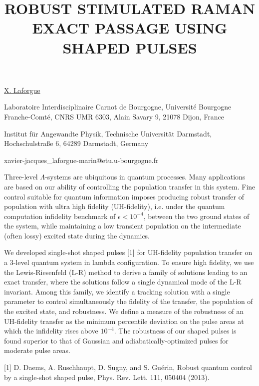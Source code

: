 \title{ROBUST STIMULATED RAMAN EXACT PASSAGE USING SHAPED PULSES}

\underline{X. Laforgue}  

{\normalsize{\vspace{-4mm}
Laboratoire Interdisciplinaire Carnot de Bourgogne, Universit\'e Bourgogne Franche-Comt\'e, CNRS UMR 6303, Alain Savary 9, 21078 Dijon, France

Institut f\"ur Angewandte Physik, Technische Universit\"at Darmstadt, Hochschulstra\ss e 6, 64289 Darmstadt, Germany



\email xavier-jacques\_laforgue-marin@etu.u-bourgogne.fr}}

Three-level $\Lambda$-systems are ubiquitous in quantum processes. Many applications are based on our ability of controlling the population transfer in this system. Fine control suitable for quantum information imposes producing robust transfer of population with ultra high fidelity (UH-fidelity), i.e. under the quantum computation infidelity benchmark of $\epsilon<10^{-4}$, between the two ground states of the system, while maintaining a low transient population on the intermediate (often lossy) excited state during the dynamics.

We developed single-shot shaped pulses [1] for UH-fidelity population transfer on a 3-level quantum system in lambda configuration. To ensure high fidelity, we use the Lewis-Riesenfeld (L-R) method to derive a family of solutions leading to an exact transfer, where the solutions follow a single dynamical mode of the L-R invariant. Among this family, we identify a tracking solution with a single parameter to control simultaneously the fidelity of the transfer, the population of the excited state, and robustness. We define a measure of the robustness of an UH-fidelity transfer as the minimum percentile deviation on the pulse areas at which the infidelity rises above $10^{-4}$. The robustness of our shaped pulses is found superior to that of Gaussian and adiabatically-optimized pulses for moderate pulse areas.

{\normalsize
[1] D. Daems, A. Ruschhaupt, D. Sugny, and S. Gu\'erin, Robust quantum control by a single-shot shaped pulse, Phys. Rev. Lett. 111, 050404 (2013).
}

\vspace{\baselineskip}